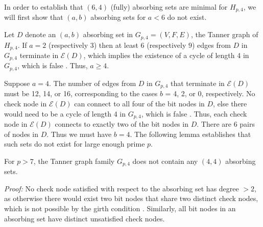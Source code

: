 In order to establish that $(6,4)$ (fully) absorbing sets are
minimal for $H_{p,4}$, we will first show that $(a,b)$ absorbing
sets for $a < 6$ do not exist.



Let $D$ denote an $(a,b)$ absorbing set in $G_{p,4}=(V,F,E)$, the
Tanner graph of $H_{p,4}$. If $a=2$ (respectively $3$) then at
least $6$ (respectively $9$) edges from $D$ in $G_{p,4}$ terminate
in $\mathcal{E}(D)$, which implies the existence of a cycle of
length 4 in $G_{p,4}$, which is false \cite{fan}. Thus, $a \geq
4$.

Suppose $a=4$. The number of edges from $D$ in $G_{p,4}$ that
terminate in $\mathcal{E}(D)$ must be 12, 14, or 16, corresponding
to the cases $b$ = 4, 2, or 0, respectively. No check node in
$\mathcal{E}(D)$ can connect to all four of the bit nodes in $D$,
else there would need to be a cycle of length 4 in $G_{p,4}$,
which is false \cite{fan}. Thus, each check node in
$\mathcal{E}(D)$ connects to exactly two of the bit nodes in $D$.
There are $6$ pairs of nodes in $D$. Thus we must have $b=4$. The
following lemma establishes that such sets do not exist for large
enough prime $p$.


\begin{lemma}\label{Lem2} For $p>7$, the Tanner graph family $G_{p,4}$
does not contain any $(4,4)$ absorbing sets.
\end{lemma}
\noindent \textit{Proof:} No check node satisfied with respect to
the absorbing set has degree $> 2$, as otherwise there would exist
two bit nodes that share two distinct check nodes, which is not
possible by the girth condition \cite{fan}. Similarly, all bit
nodes in an absorbing set have distinct unsatisfied check nodes.

